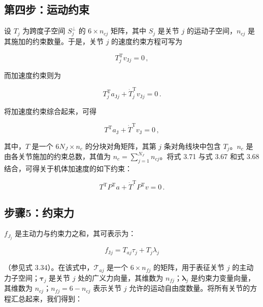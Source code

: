 \documentclass[10pt,a4paper]{book}
\theoremstyle{thmstyle} %
\theoremstyle{defstyle} %
\theoremstyle{prostyle} %
\begin{document}
\subsection{第四步：运动约束}





设 $T_{j}$ 为跨度子空间 $S_{j}^{\perp}$ 的 $6 \times n_{cj}$ 矩阵，其中 $S_{j}$ 是关节 $j$ 的运动子空间，$n_{cj}$ 是其施加的约束数量。于是，关节 $j$ 的速度约束方程可写为



$$
T _ { j } ^{\mathrm { T} } v _ { \mathrm { J } j } = 0 \, ,
$$



而加速度约束则为



$$
T _ { j } ^{\mathrm { T} } a _ { \mathrm { J } j } + \dot { T } _ { j } ^{\mathrm { T} } v _ { \mathrm { J } j } = 0 \, .
$$



将加速度约束综合起来，可得



$$
T ^{\mathrm { T} } a _ { \mathrm { J } } + \dot { T } ^{\mathrm { T} } v _ { \mathrm { J } } = 0 \, ,
$$



其中，$T$ 是一个 $6N_J \times n_c$ 的分块对角矩阵，其第 $j$ 条对角线块中包含 $T_j$。$n_c$ 是由各关节施加的约束总数，其值为 $n_c = \sum_{j=1}^{N_J} n_{cj}$。将式 3.71 与式 3.67 和式 3.68 结合，可得关于机体加速度的如下约束：



$$
T ^{\mathrm { T} } P ^{\mathrm { T} } a + \dot { T } ^{\mathrm { T} } P ^{\mathrm { T} } v = 0 \, .
$$



\subsection{步骤5：约束力}





$f_{J_{j}}$ 是主动力与约束力之和，其可表示为：



$$
f _ { \mathrm { J } j } = T _ { a j } \tau _ { j } + T _ { j } \lambda _ { j }
$$



（参见式 3.34）。在该式中，$\mathcal{T}_{aj}$ 是一个 $6 \times n_{fj}$ 的矩阵，用于表征关节 $j$ 的主动力子空间；$\boldsymbol{\tau}_{j}$ 是关节 $j$ 处的广义力向量，其维数为 $n_{fj}$；$\boldsymbol{\lambda}_{j}$ 是约束力变量向量，其维数为 $n_{cj}$；$n_{fj} = 6 - n_{cj}$ 表示关节 $j$ 允许的运动自由度数量。将所有关节的方程汇总起来，我们得到：
\end{document}
